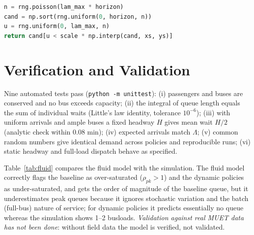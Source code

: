 \documentclass[10pt,twocolumn,letterpaper]{article}
\begin{document}
\begin{lstlisting}[language=Python,caption={Non-homogeneous Poisson arrivals by thinning.}]
n = rng.poisson(lam_max * horizon)
cand = np.sort(rng.uniform(0, horizon, n))
u = rng.uniform(0, lam_max, n)
return cand[u < scale * np.interp(cand, xs, ys)]
\end{lstlisting}

\section{Verification and Validation}
Nine automated tests pass (\texttt{python -m unittest}): (i) passengers and buses are conserved and no bus exceeds capacity; (ii)
the integral of queue length equals the sum of individual waits (Little's law identity, tolerance $10^{-6}$); (iii) with uniform arrivals and ample
buses a fixed headway $H$ gives mean wait $H/2$ (analytic check within 0.08 min); (iv) expected arrivals match $\Lambda$; (v) common
random numbers give identical demand across policies and reproducible runs; (vi) static headway and full-load dispatch behave as specified.

Table~\ref{tab:fluid} compares the fluid model with the simulation. The fluid model correctly flags the baseline as over-saturated
($\rho_{pk}>1$) and the dynamic policies as under-saturated, and gets the order of magnitude of the baseline queue, but it underestimates peak queues because it ignores
stochastic variation and the batch (full-bus) nature of service; for dynamic policies it predicts essentially no queue whereas the simulation shows 1--2 busloads.
\emph{Validation against real MUET data has not been done}: without field data the model is verified, not validated.

\begin{table}[t]\centering\caption{Fluid approximation vs.\ simulation (peak queue at dominant terminal, passengers).}\label{tab:fluid}
\footnotesize
\end{table}
\end{document}
